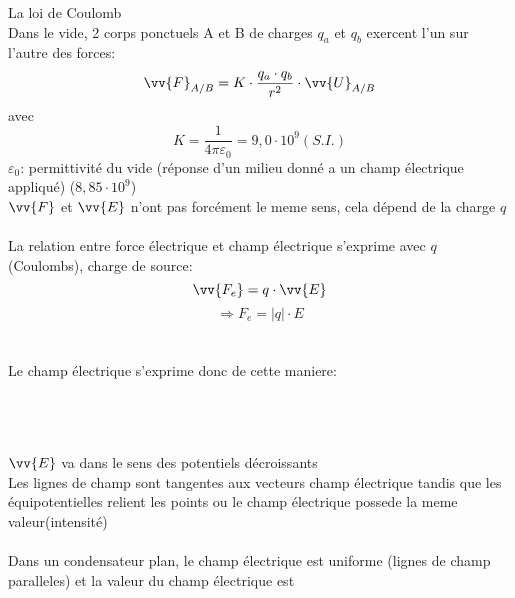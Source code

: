 \begin{Definition}
La loi de Coulomb\\
Dans le vide, 2 corps ponctuels A et B de charges $q_{a}$ et $q_{b}$ exercent l'un sur l'autre des forces: \\
$$ \vv{F}_{A/B} = K \cdot \dfrac{q_{a}\cdot q_{b}}{r^2} \cdot \vv{U}_{A/B} $$
avec\\
$$K=\dfrac{1}{4\pi\varepsilon_{0}}= 9,0\cdot 10^9(S.I.)$$
$\varepsilon_{0}$: permittivité du vide (réponse d'un milieu donné a un champ électrique appliqué) ($8,85\cdot 10^9$)\\
\danger[5ex] \qquad $\vv{F}$ et $\vv{E}$ n'ont pas forcément le meme sens, cela dépend de la charge $q$\\\\

La relation entre force électrique et champ électrique s'exprime avec $q$ (Coulombs), charge de source:
$$\vv{F_{e}}=q\cdot \vv{E}$$
$$\Rightarrow F_{e}=|q|\cdot E$$\\\\
Le champ électrique s'exprime donc de cette maniere:\\\\
\\\\
$\vv{E}$ va dans le sens des potentiels décroissants\\
Les lignes de champ sont tangentes aux vecteurs champ électrique tandis que les équipotentielles relient les points ou le champ électrique possede la meme valeur(intensité) \\\\
Dans un condensateur plan, le champ électrique est uniforme (lignes de champ paralleles) et la valeur du champ électrique est\\
\end{Definition}
